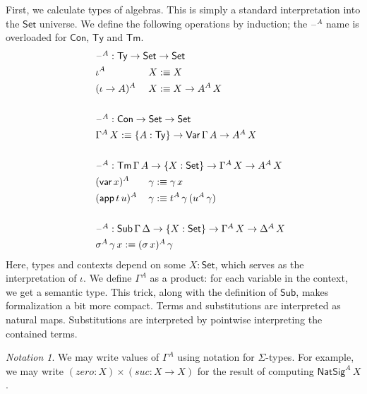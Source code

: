 \documentclass[12pt,a4paper,twoside,openany]{book}
\theoremstyle{remark}
\newtheorem{notation}{Notation}
\theoremstyle{definition}
\theoremstyle{theorem}
\newcommand{\mi}[1]{\mathit{#1}}
\newcommand{\ms}[1]{\mathsf{#1}}
\newcommand{\Con}{\mathsf{Con}}
\newcommand{\Sub}{\mathsf{Sub}}
\newcommand{\Tm}{\mathsf{Tm}}
\newcommand{\Ty}{\mathsf{Ty}}
\newcommand{\blank}{\mathord{\hspace{1pt}\text{--}\hspace{1pt}}}
\newcommand{\Set}{\mathsf{Set}}
\newcommand{\Var}{\ms{Var}}
\newcommand{\var}{\ms{var}}
\newcommand{\app}{\ms{app}}
\newcommand{\defn}{:\equiv}
\begin{document}
First, we calculate types of algebras. This is simply a standard interpretation
into the $\Set$ universe. We define the following operations by induction; the
$\blank^A$ name is overloaded for $\Con$, $\Ty$ and $\Tm$.
\begin{alignat*}{3}
& \hspace{-4em} \rlap{$\blank^A : \Ty \to \Set \to \Set$} \\
& \hspace{-4em} \iota^A\,&&X \defn X \\
& \hspace{-4em} (\iota\to A)^A\,&&X \defn X \to A^A\,X\\
& \hspace{-4em} && \\
& \hspace{-4em} \rlap{$\blank^A : \Con \to \Set \to \Set$}\\
& \hspace{-4em} \rlap{$\Gamma^A\,X \defn \{A : \Ty\} \to \Var\,\Gamma\,A \to A^A\,X$}\\
& \hspace{-4em} && \\
& \hspace{-4em} \rlap{$\blank^A : \Tm\,\Gamma\,A \to \{X : \Set\} \to \Gamma^A\,X \to A^A\,X$}\\
& \hspace{-4em} (\var\,x)^A\,&&\gamma \defn \gamma\,x\\
& \hspace{-4em} (\app\,t\,u)^A\,&&\gamma \defn t^A\,\gamma\,(u^A\,\gamma)\\
& \hspace{-4em} && \\
& \hspace{-4em} \rlap{$\blank^A : \Sub\,\Gamma\,\Delta \to \{X : \Set\} \to \Gamma^A\,X \to \Delta^A\,X$}\\
& \hspace{-4em} \rlap{$\sigma^A\,\gamma\,x \defn (\sigma\,x)^A\,\gamma$}
\end{alignat*}
Here, types and contexts depend on some $X : \Set$, which serves as the
interpretation of $\iota$. We define $\Gamma^A$ as a product: for each variable
in the context, we get a semantic type. This trick, along with the definition of
$\Sub$, makes formalization a bit more compact. Terms and substitutions are
interpreted as natural maps. Substitutions are interpreted by pointwise interpreting
the contained terms.

\begin{notation}
We may write values of $\Gamma^A$ using notation for $\Sigma$-types. For
example, we may write $(\mi{zero} : X) \times (\mi{suc} : X \to X)$ for the
result of computing $\ms{NatSig}^A\,X$.
\end{notation}
\end{document}
